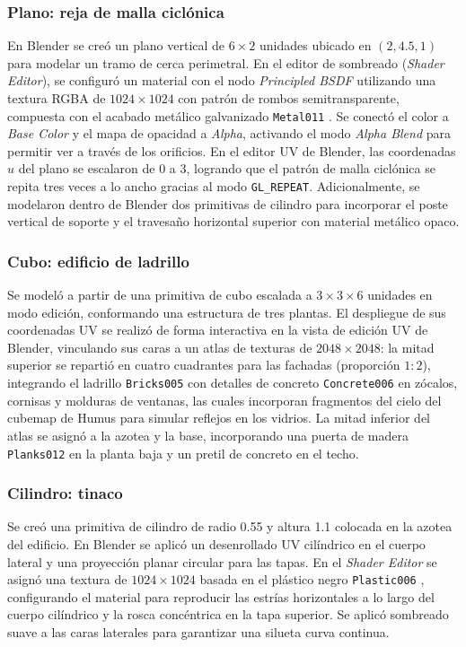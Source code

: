 \subsubsection{Plano: reja de malla ciclónica}
En Blender se creó un plano vertical de $6 \times 2$ unidades ubicado en $(2, 4.5, 1)$ para modelar un tramo de cerca perimetral. En el editor de sombreado (\textit{Shader Editor}), se configuró un material con el nodo \textit{Principled BSDF} utilizando una textura RGBA de $1024 \times 1024$ con patrón de rombos semitransparente, compuesta con el acabado metálico galvanizado \texttt{Metal011} \cite{ambientcg}. Se conectó el color a \textit{Base Color} y el mapa de opacidad a \textit{Alpha}, activando el modo \textit{Alpha Blend} para permitir ver a través de los orificios. En el editor UV de Blender, las coordenadas $u$ del plano se escalaron de $0$ a $3$, logrando que el patrón de malla ciclónica se repita tres veces a lo ancho gracias al modo \texttt{GL\_REPEAT}. Adicionalmente, se modelaron dentro de Blender dos primitivas de cilindro para incorporar el poste vertical de soporte y el travesaño horizontal superior con material metálico opaco.

\subsubsection{Cubo: edificio de ladrillo}
Se modeló a partir de una primitiva de cubo escalada a $3 \times 3 \times 6$ unidades en modo edición, conformando una estructura de tres plantas. El despliegue de sus coordenadas UV se realizó de forma interactiva en la vista de edición UV de Blender, vinculando sus caras a un atlas de texturas de $2048 \times 2048$: la mitad superior se repartió en cuatro cuadrantes para las fachadas (proporción $1{:}2$), integrando el ladrillo \texttt{Bricks005} con detalles de concreto \texttt{Concrete006} \cite{ambientcg} en zócalos, cornisas y molduras de ventanas, las cuales incorporan fragmentos del cielo del cubemap de Humus para simular reflejos en los vidrios. La mitad inferior del atlas se asignó a la azotea y la base, incorporando una puerta de madera \texttt{Planks012} en la planta baja y un pretil de concreto en el techo.

\subsubsection{Cilindro: tinaco}
Se creó una primitiva de cilindro de radio 0.55 y altura 1.1 colocada en la azotea del edificio. En Blender se aplicó un desenrollado UV cilíndrico en el cuerpo lateral y una proyección planar circular para las tapas. En el \textit{Shader Editor} se asignó una textura de $1024 \times 1024$ basada en el plástico negro \texttt{Plastic006} \cite{ambientcg}, configurando el material para reproducir las estrías horizontales a lo largo del cuerpo cilíndrico y la rosca concéntrica en la tapa superior. Se aplicó sombreado suave a las caras laterales para garantizar una silueta curva continua.


